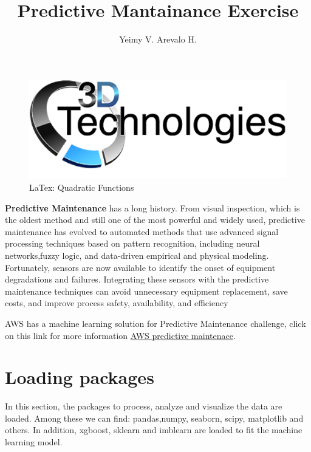 \documentclass[11pt]{article}
\title{Predictive Mantainance Exercise}
\author{Yeimy V. Arevalo H.}
\begin{document}
    
    \maketitle
    
    

    
    \begin{figure}
\centering
\includegraphics{3DTechLogo.png}
\caption{LaTex: Quadratic Functions}
\end{figure}

    \textbf{Predictive Maintenance} has a long history. From visual
inspection, which is the oldest method and still one of the most
powerful and widely used, predictive maintenance has evolved to
automated methods that use advanced signal processing techniques based
on pattern recognition, including neural networks,fuzzy logic, and
data-driven empirical and physical modeling. Fortunately, sensors are
now available to identify the onset of equipment degradations and
failures. Integrating these sensors with the predictive maintenance
techniques can avoid unnecessary equipment replacement, save costs, and
improve process safety, availability, and efficiency
\cite{hashemian2010state}

AWS has a machine learning solution for Predictive Maintenance
challenge, click on this link for more information
\href{https://aws.amazon.com/solutions/predictive-maintenance-using-machine-learning}{AWS
predictive maintenace}.

    \hypertarget{loading-packages}{%
\section{Loading packages}\label{loading-packages}}

    In this section, the packages to process, analyze and visualize the data
are loaded. Among these we can find: pandas,numpy, seaborn, scipy,
matplotlib and others. In addition, xgboost, sklearn and imblearn are
loaded to fit the machine learning model.
\end{document}
